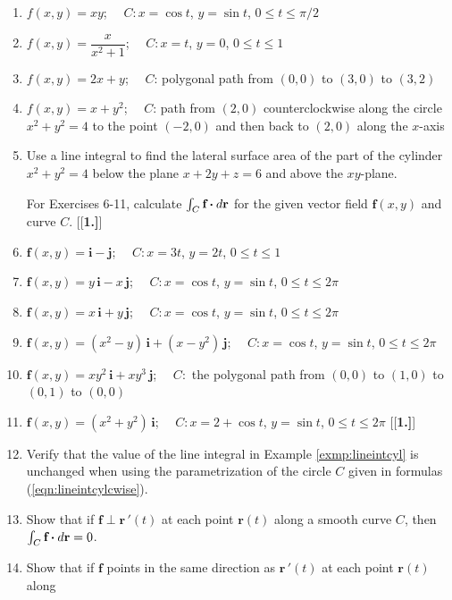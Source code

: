 \begin{enumerate}[\bfseries 1.]
 \item $f(x,y)=xy$; $\quad C: x=\cos t$, $y=\sin t$, $0 \le t \le \pi/2$
 \item $f(x,y)=\dfrac{x}{x^2 + 1}$; $\quad C: x=t$, $y=0$, $0 \le t \le 1$
 \item $f(x,y)=2x+y$; $\quad C$: polygonal path from $(0,0)$ to $(3,0)$ to $(3,2)$
 \item $f(x,y)=x+y^2$; $\quad C$: path from $(2,0)$ counterclockwise along the circle $x^2 + y^2 = 4$ to the point
  $(-2,0)$ and then back to $(2,0)$ along the $x$-axis
 \item Use a line integral to find the lateral surface area of the part of the cylinder\\$x^2 + y^2 = 4$ below
 the plane $x+2y+z=6$ and above the $xy$-plane.
\par\noindent For Exercises 6-11, calculate $\int_C \textbf{f} \bm{\cdot} d\textbf{r}$ for the given vector
 field $\textbf{f}(x,y)$ and curve $C$.
[{[\bfseries 1.]}]
 \item $\textbf{f}(x,y) = \textbf{i} - \textbf{j}$; $\quad C: x=3t$, $y=2t$, $0 \le t \le 1$
 \item $\textbf{f}(x,y) = y\,\textbf{i} - x\,\textbf{j}$; $\quad C: x=\cos t$, $y=\sin t$, $0 \le t \le 2\pi$
 \item $\textbf{f}(x,y) = x\,\textbf{i} + y\,\textbf{j}$; $\quad C: x=\cos t$, $ y=\sin t$, $0 \le t \le 2\pi$
 \item $\textbf{f}(x,y) = (x^2 - y)\,\textbf{i} + (x-y^2 )\,\textbf{j}$; $\quad C: x=\cos t$, $y=\sin t$,
  $0 \le t \le 2\pi$
 \item $\textbf{f}(x,y) = xy^2 \,\textbf{i} + xy^3 \,\textbf{j}$; $\quad C:$ the polygonal path from $(0,0)$ to $(1,0)$
 to $(0,1)$ to $(0,0)$
 \item $\textbf{f}(x,y) =(x^2 + y^2 )\,\textbf{i}$; $\quad C: x=2+\cos t$, $y=\sin t$, $0 \le t \le 2\pi$
[{[\bfseries 1.]}]
 \item Verify that the value of the line integral in Example \ref{exmp:lineintcyl} is unchanged when using the
  parametrization of the circle $C$ given in formulas (\ref{eqn:lineintcylcwise}).
 \item Show that if $\textbf{f} \perp \textbf{r}\,'(t)$ at each point $\textbf{r}(t)$ along a smooth curve $C$, then
  $\int_C \textbf{f} \bm{\cdot} d\textbf{r} = 0$.
 \item Show that if $\textbf{f}$ points in the same direction as $\textbf{r}\,'(t)$ at each point $\textbf{r}(t)$ along

\end{enumerate}
